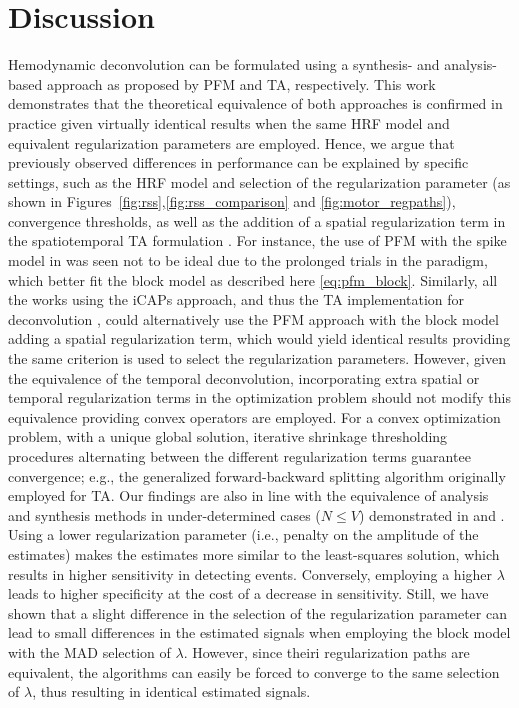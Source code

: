 
\section{Discussion}

Hemodynamic deconvolution can be formulated using a synthesis- and
analysis-based approach as proposed by PFM and TA, respectively. This work
demonstrates that the theoretical equivalence of both
approaches is confirmed in practice given virtually identical results when the
same HRF model and equivalent regularization parameters are employed. Hence, we
argue that previously observed differences in performance can be explained by
specific settings, such as the HRF model and selection of the regularization
parameter (as shown in
Figures~\ref{fig:rss},\ref{fig:rss_comparison} and \ref{fig:motor_regpaths}),
convergence thresholds, as well as the addition of a spatial regularization term
in the spatiotemporal TA formulation \citep{Karahanoglu2013TotalactivationfMRI}.
For instance, the use of PFM with the spike model in
\citep{Tan_2017} was seen not to be ideal due to the prolonged trials in the
paradigm, which better fit the block model as described here
\eqref{eq:pfm_block}. Similarly, all the works using the iCAPs approach, and
thus the TA implementation for deconvolution
\citep{Kinany2020DynamicFunctionalConnectivity,Zoeller2019Largescalebrain,
Pirondini2022Poststrokereorganization}, could alternatively use the PFM approach
with the block model adding a spatial regularization term, which would yield
identical results providing the same criterion is used to select the
regularization parameters. However, given the equivalence of the temporal
deconvolution, incorporating extra spatial or temporal regularization terms in
the optimization problem should not modify this equivalence providing convex
operators are employed. For a convex optimization problem, with a unique global
solution, iterative shrinkage thresholding procedures alternating between the
different regularization terms guarantee convergence; e.g., the generalized
forward-backward splitting \citep{Raguet2013GeneralizedForwardBackward}
algorithm originally employed for TA. Our findings are also in line with the
equivalence of analysis and synthesis methods in under-determined cases (\(N
\leq V\)) demonstrated in \citep{Elad2007Analysisversussynthesis} and
\citep{ortelli2019synthesis}. Using a lower regularization
parameter (i.e., penalty on the amplitude of the estimates) makes the estimates
more similar to the least-squares solution, which results in higher sensitivity
in detecting events. Conversely, employing a higher $\lambda$ leads to higher
specificity at the cost of a decrease in sensitivity. Still, we have shown that
a slight difference in the selection of the regularization parameter can lead to
small differences in the estimated signals when employing the block model with
the MAD selection of $\lambda$. However, since theiri regularization paths are
equivalent, the algorithms can easily be forced to converge to the same
selection of $\lambda$, thus resulting in identical estimated signals.

